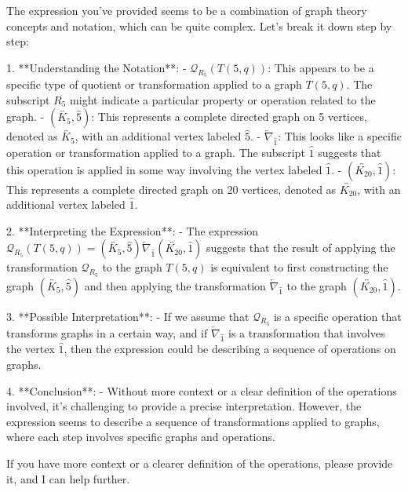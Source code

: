 The expression you've provided seems to be a combination of graph theory concepts and notation, which can be quite complex. Let's break it down step by step:

1. **Understanding the Notation**:
   - $\mathcal{Q}_{R_5}(T(5,q))$: This appears to be a specific type of quotient or transformation applied to a graph $T(5,q)$. The subscript $R_5$ might indicate a particular property or operation related to the graph.
   - $(\overleftrightarrow{K_5}, \hat{5})$: This represents a complete directed graph on 5 vertices, denoted as $\overleftrightarrow{K_5}$, with an additional vertex labeled $\hat{5}$.
   - $\overleftarrow{\nabla}_{\hat{1}}$: This looks like a specific operation or transformation applied to a graph. The subscript $\hat{1}$ suggests that this operation is applied in some way involving the vertex labeled $\hat{1}$.
   - $\left(\overleftrightarrow{K_{20}}, \hat{1}\right)$: This represents a complete directed graph on 20 vertices, denoted as $\overleftrightarrow{K_{20}}$, with an additional vertex labeled $\hat{1}$.

2. **Interpreting the Expression**:
   - The expression $\mathcal{Q}_{R_5}(T(5,q)) = (\overleftrightarrow{K_5}, \hat{5}) \overleftarrow{\nabla}_{\hat{1}} \left(\overleftrightarrow{K_{20}}, \hat{1}\right)$ suggests that the result of applying the transformation $\mathcal{Q}_{R_5}$ to the graph $T(5,q)$ is equivalent to first constructing the graph $(\overleftrightarrow{K_5}, \hat{5})$ and then applying the transformation $\overleftarrow{\nabla}_{\hat{1}}$ to the graph $\left(\overleftrightarrow{K_{20}}, \hat{1}\right)$.

3. **Possible Interpretation**:
   - If we assume that $\mathcal{Q}_{R_5}$ is a specific operation that transforms graphs in a certain way, and if $\overleftarrow{\nabla}_{\hat{1}}$ is a transformation that involves the vertex $\hat{1}$, then the expression could be describing a sequence of operations on graphs.

4. **Conclusion**:
   - Without more context or a clear definition of the operations involved, it's challenging to provide a precise interpretation. However, the expression seems to describe a sequence of transformations applied to graphs, where each step involves specific graphs and operations.

If you have more context or a clearer definition of the operations, please provide it, and I can help further.